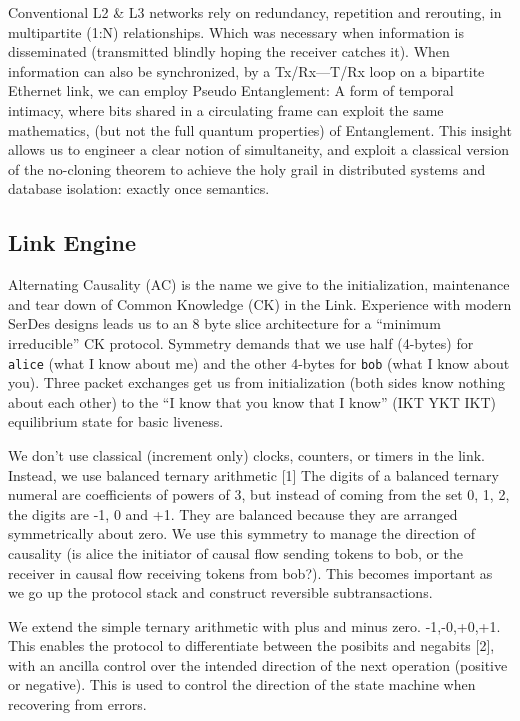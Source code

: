 \documentclass[../../../OAE-SPEC-MAIN.tex]{subfiles}
\begin{document}
Conventional L2 \& L3 networks rely on redundancy, repetition and rerouting, in multipartite (1:N) relationships. Which was necessary when information is disseminated (transmitted blindly hoping the receiver catches it). When information can also be synchronized, by a Tx/Rx—T/Rx loop on a bipartite Ethernet link, we can employ Pseudo Entanglement: A form of temporal intimacy, where bits shared in a circulating frame can exploit the same mathematics, (but not the full quantum properties) of Entanglement. This insight allows us to engineer a clear notion of simultaneity, and exploit a classical version of the no-cloning theorem to achieve the holy grail in distributed systems and database isolation: exactly once semantics.

\subsection{Link Engine}

Alternating Causality (AC) is the name we give to the initialization, maintenance and tear down of Common Knowledge (CK) in the Link. Experience with modern SerDes designs leads us to an 8 byte slice architecture for a “minimum irreducible” CK protocol. Symmetry demands that we use half (4-bytes) for \texttt{alice} (what I know about me) and the other 4-bytes for \texttt{bob} (what I know about you). Three packet exchanges get us from initialization (both sides know nothing about each other) to the “I know that you know that I know” (IKT YKT IKT) equilibrium state for basic liveness. 

We don’t use classical (increment only) clocks, counters, or timers in the link. Instead, we use balanced ternary arithmetic [1] The digits of a balanced ternary numeral are coefficients of powers of 3, but instead of coming from the set {0, 1, 2}, the digits are {-1, 0 and +1}. They are balanced because they are arranged symmetrically about zero.  We use this symmetry to manage the direction of causality (is alice the initiator of causal flow sending tokens to bob, or the receiver in causal flow receiving tokens from bob?).  This becomes important as we go up the protocol stack and construct reversible subtransactions.  

We extend the simple ternary arithmetic with plus and minus zero. {-1,-0,+0,+1}. This enables the protocol to differentiate between the posibits and negabits [2], with an ancilla control over the intended direction of the next operation (positive or negative). This is used to control the direction of the state machine when recovering from errors.
\end{document}
